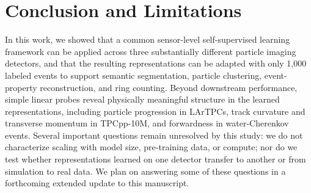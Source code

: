 \section{Conclusion and Limitations}
\label{sec:conclusion}

In this work, we showed that a common sensor-level self-supervised learning framework can be applied across three substantially different particle imaging detectors, and that the resulting representations can be adapted with only 1,000 labeled events to support semantic segmentation, particle clustering, event-property reconstruction, and ring counting. Beyond downstream performance, simple linear probes reveal physically meaningful structure in the learned representations, including particle progression in LArTPCs, track curvature and transverse momentum in TPCpp-10M, and forwardness in water-Cherenkov events. Several important questions remain unresolved by this study: we do not characterize scaling with model size, pre-training data, or compute; nor do we test whether representations learned on one detector transfer to another or from simulation to real data. We plan on answering some of these questions in a forthcoming extended update to this manuscript.

